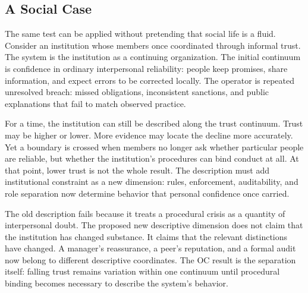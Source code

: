 \documentclass[11pt,a4paper,openany]{book}
\begin{document}
\subsection{A Social Case}
The same test can be applied without pretending that social life is a fluid. Consider an institution whose members once coordinated through informal trust. The system is the institution as a continuing organization. The initial continuum is confidence in ordinary interpersonal reliability: people keep promises, share information, and expect errors to be corrected locally. The operator is repeated unresolved breach: missed obligations, inconsistent sanctions, and public explanations that fail to match observed practice. \cite{landau_stat_physics,prigogine_dissipative}\par
For a time, the institution can still be described along the trust continuum. Trust may be higher or lower. More evidence may locate the decline more accurately. Yet a boundary is crossed when members no longer ask whether particular people are reliable, but whether the institution's procedures can bind conduct at all. At that point, lower trust is not the whole result. The description must add institutional constraint as a new dimension: rules, enforcement, auditability, and role separation now determine behavior that personal confidence once carried.\par
The old description fails because it treats a procedural crisis as a quantity of interpersonal doubt. The proposed new descriptive dimension does not claim that the institution has changed substance. It claims that the relevant distinctions have changed. A manager's reassurance, a peer's reputation, and a formal audit now belong to different descriptive coordinates. The OC result is the separation itself: falling trust remains variation within one continuum until procedural binding becomes necessary to describe the system's behavior.\par
\end{document}
